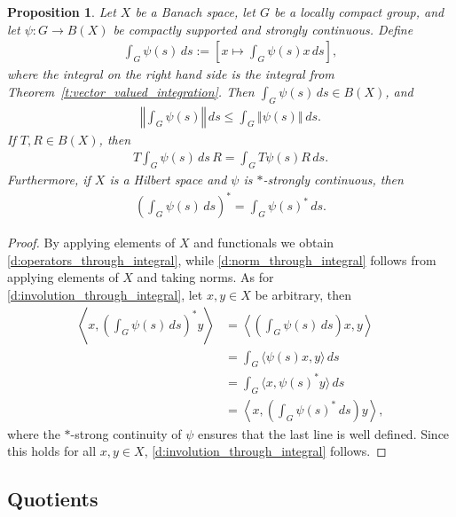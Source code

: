 \documentclass{amsart}
\theoremstyle{plain}
\newtheorem{prop}[theorem]{Proposition}
\theoremstyle{definition}
\numberwithin{equation}{section}
\begin{document}
\begin{prop}
Let $X$ be a Banach space, let $G$ be a locally compact group, and let $\psi: G \to B(X)$ be compactly supported and strongly continuous. Define
\begin{align}\label{d:pointwise_integral_for_sot_continuous_representation}
  \int_G \psi(s) \,ds := \left[ x \mapsto \int_G \psi(s)x \,ds \right] ,
\end{align}
where the integral on the right hand side is the integral from Theorem~\ref{t:vector_valued_integration}. Then $\int_G \psi(s)\,ds\in B(X)$, and
\begin{align}\label{d:norm_through_integral}
{\left\Vert {\int_G \psi(s)} \right\Vert} {\,ds} \leq \int_G {\left\Vert {\psi(s)} \right\Vert} {\,ds}.
\end{align}
If $T,R \in B(X)$, then
\begin{align}\label{d:operators_through_integral}
 T \int_G \psi(s) {\,ds} \, R = \int_G T \psi(s) R {\,ds}.
\end{align}
Furthermore, if $X$ is a Hilbert space and $\psi$ is $*$-strongly continuous, then
\begin{align}\label{d:involution_through_integral}
 \left( \int_G \psi(s) {\,ds} \right)^* = \int_G \psi(s)^* {\,ds}.
\end{align}
\end{prop}

\begin{proof}
 By applying elements of $X$ and functionals we obtain \eqref{d:operators_through_integral}, while \eqref{d:norm_through_integral} follows from applying elements of $X$ and taking norms. As for \eqref{d:involution_through_integral}, let $x,y \in X$ be arbitrary, then
\begin{align*}
 \left\langle x, \left( \int_G \psi(s) {\,ds} \right)^* y \right\rangle &= \left\langle \left( \int_G \psi(s) {\,ds} \right) x, y \right\rangle \\
&= \int_G \langle \psi(s)x, y \rangle {\,ds} \\
&= \int_G \langle x, \psi(s)^* y \rangle {\,ds} \\
&= \left\langle x, \left( \int_G \psi(s)^* {\,ds} \right) y \right\rangle,
\end{align*}
where the $*$-strong continuity of $\psi$ ensures that the last line is well defined. Since this holds for all $x,y \in X$, \eqref{d:involution_through_integral} follows.
\end{proof}

\subsection{Quotients}\label{subsec:quotients}
\end{document}
